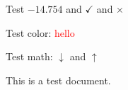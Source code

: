 \documentclass{article}
\begin{document}
Test $-14.754$ and $\checkmark$ and $\times$

Test color: \textcolor{red}{hello}

Test math: $\downarrow$ and $\uparrow$

This is a test document.
\end{document}
